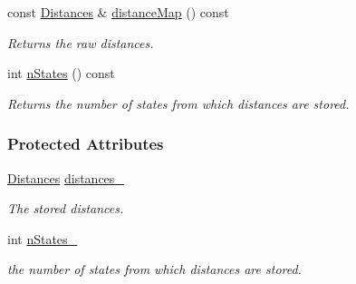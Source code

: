 \begin{DoxyCompactItemize}
const \hyperlink{structslb_1_1ext_1_1heuristic_1_1differential_1_1DistanceMap_3_01State_00_01Index_00_01IndexKind_1_1none_01_4_a41fb62a9e902a7786b604a806317ac47}{Distances} \& \hyperlink{structslb_1_1ext_1_1heuristic_1_1differential_1_1DistanceMap_3_01State_00_01Index_00_01IndexKind_1_1none_01_4_af26fe94fd1f7774eaccc4f085c04603f}{distance\+Map} () const 
\begin{DoxyCompactList}\small\item\em Returns the raw distances. \end{DoxyCompactList}\item 
int \hyperlink{structslb_1_1ext_1_1heuristic_1_1differential_1_1DistanceMap_3_01State_00_01Index_00_01IndexKind_1_1none_01_4_a339a4cd0f26c792b27f4f07c0b9db335}{n\+States} () const 
\begin{DoxyCompactList}\small\item\em Returns the number of states from which distances are stored. \end{DoxyCompactList}\end{DoxyCompactItemize}
\subsubsection*{Protected Attributes}
\begin{DoxyCompactItemize}
\item 
\hyperlink{structslb_1_1ext_1_1heuristic_1_1differential_1_1DistanceMap_3_01State_00_01Index_00_01IndexKind_1_1none_01_4_a41fb62a9e902a7786b604a806317ac47}{Distances} \hyperlink{structslb_1_1ext_1_1heuristic_1_1differential_1_1DistanceMap_3_01State_00_01Index_00_01IndexKind_1_1none_01_4_a878e5bbd052dd9c39fcfa60c528cdf24}{distances\+\_\+}\hypertarget{structslb_1_1ext_1_1heuristic_1_1differential_1_1DistanceMap_3_01State_00_01Index_00_01IndexKind_1_1none_01_4_a878e5bbd052dd9c39fcfa60c528cdf24}{}\label{structslb_1_1ext_1_1heuristic_1_1differential_1_1DistanceMap_3_01State_00_01Index_00_01IndexKind_1_1none_01_4_a878e5bbd052dd9c39fcfa60c528cdf24}

\begin{DoxyCompactList}\small\item\em The stored distances. \end{DoxyCompactList}\item 
int \hyperlink{structslb_1_1ext_1_1heuristic_1_1differential_1_1DistanceMap_3_01State_00_01Index_00_01IndexKind_1_1none_01_4_a0ef73098766ead44e477377fefaa648a}{n\+States\+\_\+}\hypertarget{structslb_1_1ext_1_1heuristic_1_1differential_1_1DistanceMap_3_01State_00_01Index_00_01IndexKind_1_1none_01_4_a0ef73098766ead44e477377fefaa648a}{}\label{structslb_1_1ext_1_1heuristic_1_1differential_1_1DistanceMap_3_01State_00_01Index_00_01IndexKind_1_1none_01_4_a0ef73098766ead44e477377fefaa648a}

\begin{DoxyCompactList}\small\item\em the number of states from which distances are stored. \end{DoxyCompactList}\end{DoxyCompactItemize}


